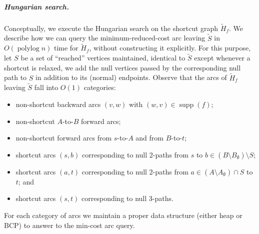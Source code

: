 \documentclass[a4paper,UKenglish]{socg-lipics-v2018}
\makeatletter
\def\polylog{\mathop{\mathrm{polylog}}}
\def\eps{\varepsilon}
\DeclareMathOperator*{\argmin}{arg\,min}
\def\fsupply{\phi}
\def\supp{\operatorname{supp}}
\theoremstyle{plain}
\numberwithin{figure}{section}
\renewcommand{\paragraph}{\subparagraph}
\def\EMPH#1{\textcolor{BrickRed}{{\emph{#1}}}}
\def\n@te#1{\textsf{\boldmath \textbf{$\langle\!\langle$#1$\rangle\!\rangle$}}\leavevmode}
\def\note#1{\textcolor{red}{\n@te{#1}}}
\makeatother
\begin{document}
\paragraph{Hungarian search.}
%
%
Conceptually, we execute the Hungarian search
on the shortcut graph $\tilde{H}_f$.
We describe how we can query the minimum-reduced-cost arc leaving $\tilde{S}$ in
$O(\polylog n)$ time for $\tilde{H}_f$, without constructing it explicitly.
For this purpose, let \EMPH{$S$} be a set of ``reached'' vertices maintained,
identical to $\tilde{S}$ except whenever a shortcut is relaxed, we add the null vertices passed by the corresponding null path to $S$ in addition to its (normal) endpoints.
%
Observe that the arcs of $\tilde{H}_f$ leaving $\tilde{S}$ fall into $O(1)$ categories:
\begin{itemize}\itemsep=0pt
\item non-shortcut backward arcs $(v, w)$ with $(w, v) \in \supp(f)$;
\item non-shortcut $A$-to-$B$ forward arcs;
\item non-shortcut forward arcs from $s$-to-$A$ and from $B$-to-$t$;
\item shortcut arcs $(s, b)$ corresponding to null 2-paths from $s$ to
	$b \in (B \setminus B_\emptyset) \setminus S$;
\item shortcut arcs $(a, t)$ corresponding to null 2-paths from
	$a \in (A \setminus A_\emptyset) \cap S$ to $t$; and
\item shortcut arcs $(s, t)$ corresponding to null 3-paths.
\end{itemize}
For each category of arcs we maintain a proper data structure (either heap or BCP) to answer to the min-cost arc query.
\end{document}
